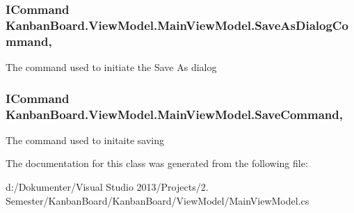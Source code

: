 \subsubsection[{Save\+As\+Dialog\+Command}]{\setlength{\rightskip}{0pt plus 5cm}I\+Command Kanban\+Board.\+View\+Model.\+Main\+View\+Model.\+Save\+As\+Dialog\+Command\hspace{0.3cm}{\ttfamily [get]}, {\ttfamily [set]}}\label{class_kanban_board_1_1_view_model_1_1_main_view_model_a67c109d76784dcd84a0b3601689518e9}


The command used to initiate the Save As dialog 

\hypertarget{class_kanban_board_1_1_view_model_1_1_main_view_model_ae8b5f8979602622e17bc76d377c8b4c2}{}
\subsubsection[{Save\+Command}]{\setlength{\rightskip}{0pt plus 5cm}I\+Command Kanban\+Board.\+View\+Model.\+Main\+View\+Model.\+Save\+Command\hspace{0.3cm}{\ttfamily [get]}, {\ttfamily [set]}}\label{class_kanban_board_1_1_view_model_1_1_main_view_model_ae8b5f8979602622e17bc76d377c8b4c2}


The command used to initaite saving 



The documentation for this class was generated from the following file\+:\begin{DoxyCompactItemize}
\item 
d\+:/\+Dokumenter/\+Visual Studio 2013/\+Projects/2. Semester/\+Kanban\+Board/\+Kanban\+Board/\+View\+Model/Main\+View\+Model.\+cs\end{DoxyCompactItemize}
